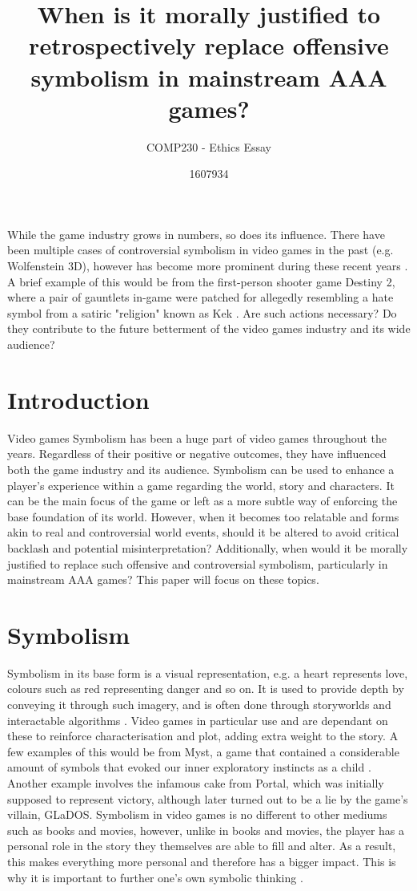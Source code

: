 \documentclass{scrartcl}
\title{When is it morally justified to retrospectively replace offensive symbolism in mainstream AAA games?}
\subtitle{COMP230 - Ethics Essay}
\author{1607934}
\begin{document}
\maketitle

\abstract{} 
While the game industry grows in numbers, so does its influence. There have been multiple cases of controversial symbolism in video games in the past (e.g. Wolfenstein 3D), however has become more prominent during these recent years \cite{jakub}. A brief example of this would be from the first-person shooter game Destiny 2, where a pair of gauntlets in-game were patched for allegedly resembling a hate symbol from a satiric "religion" known as Kek \cite{samit}. Are such actions necessary? Do they contribute to the future betterment of the video games industry and its wide audience?

\section{Introduction}
Video games Symbolism has been a huge part of video games throughout the years. Regardless of their positive or negative outcomes, they have influenced both the game industry and its audience. Symbolism can be used to enhance a player's experience within a game regarding the world, story and characters. It can be the main focus of the game or left as a more subtle way of enforcing the base foundation of its world. However, when it becomes too relatable and forms akin to real and controversial world events, should it be altered to avoid critical backlash and potential misinterpretation? Additionally, when would it be morally justified to replace such offensive and controversial symbolism, particularly in mainstream AAA games? This paper will focus on these topics.


\section{Symbolism}
Symbolism in its base form is a visual representation, e.g. a heart represents love, colours such as red representing danger and so on. It is used to provide depth by conveying it through such imagery, and is often done through storyworlds and interactable algorithms \cite{Bruchansky} \cite{nieva}. Video games in particular use and are dependant on these to reinforce characterisation and plot, adding extra weight to the story. A few examples of this would be from Myst, a game that contained a considerable amount of symbols that evoked our inner exploratory instincts as a child \cite{xander}. Another example involves the infamous cake from Portal, which was initially supposed to represent victory, although later turned out to be a lie by the game's villain, GLaDOS. Symbolism in video games is no different to other mediums such as books and movies, however, unlike in books and movies, the player has a personal role in the story they themselves are able to fill and alter. As a result, this makes everything more personal and therefore has a bigger impact. This is why it is important to further one's own symbolic thinking \cite{jefforkin}.
\end{document}
